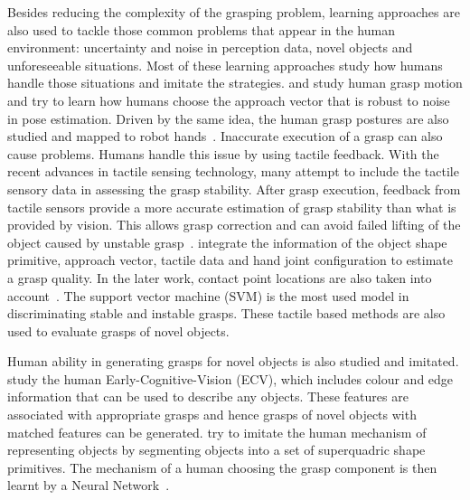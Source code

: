 Besides reducing the complexity of the grasping problem, learning approaches are also used to tackle those common problems that appear in the human environment: uncertainty and noise in perception data, novel objects and unforeseeable situations. Most of these learning approaches study how humans handle those situations and imitate the strategies. \citet{ekvall2007learning} and \citet{stulp2011learning} study human grasp motion and try to learn how humans choose the approach vector that is robust to noise in pose estimation. Driven by the same idea, the human grasp postures are also studied and mapped to robot hands~\citep{tegin2009demonstration}. Inaccurate execution of a grasp can also cause problems. Humans handle this issue by using tactile feedback.
With the recent advances in tactile sensing technology, many attempt to include the tactile sensory data in assessing the grasp stability.
After grasp execution, feedback from tactile sensors provide a more accurate estimation of grasp stability than what is provided by vision. This allows grasp correction and can avoid failed lifting of the object caused by unstable grasp~\citep{li2014learning}.
\citet{bekiroglu2011assessing} integrate the information of the object shape primitive, approach vector, tactile data and hand joint configuration to estimate a grasp quality.
In the later work, contact point locations are also taken into account~\citep{dang2012learning,dang2014stable}. The support vector machine (SVM) is the most used model in discriminating stable and instable grasps. These tactile based methods are also used to evaluate grasps of novel objects.

Human ability in generating grasps for novel objects is also studied and imitated.
\citet{detry2009learning} study the human Early-Cognitive-Vision (ECV), which includes colour and edge information that can be used to describe any objects. These features are associated with appropriate grasps and hence grasps of novel objects with matched features can be generated.
\citet{el2007learning} try to imitate the human mechanism of representing objects by segmenting objects into a set of superquadric shape primitives. The mechanism of a human choosing the grasp component is then learnt by a Neural Network~\citep{el2010new}.



